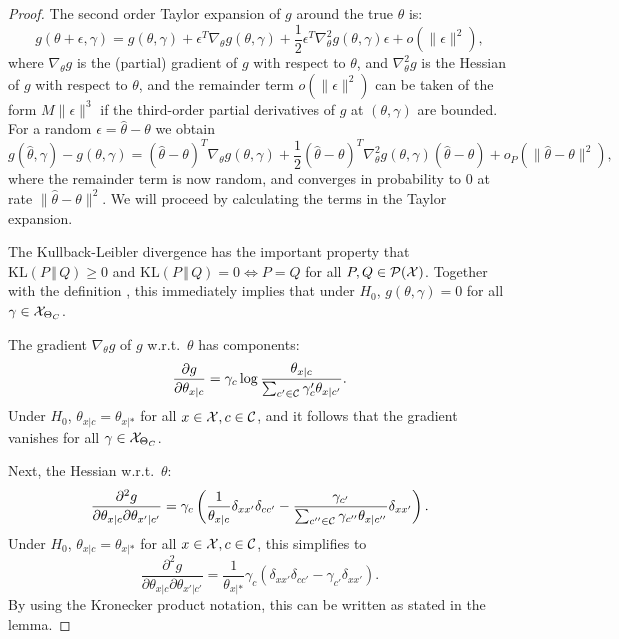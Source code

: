 \begin{proof}
The second order Taylor expansion of $g$ around the true $\theta$ is:
$$g(\theta + \epsilon, \gamma) = g(\theta,\gamma) + \epsilon^T \nabla_\theta g(\theta,\gamma) + \frac{1}{2} \epsilon^T \nabla^2_\theta g(\theta,\gamma) \epsilon + o(\lVert\epsilon\rVert^2),$$
where $\nabla_\theta g$ is the (partial) gradient of $g$ with respect to $\theta$, and
$\nabla_\theta^2 g$ is the Hessian of $g$ with respect to $\theta$, and the remainder
term $o(\lVert\epsilon\rVert^2)$ can be taken of the form $M \lVert\epsilon\rVert^3$ if the 
third-order partial derivatives of $g$ at $(\theta,\gamma)$ are bounded.
For a random $\epsilon = \hat\theta - \theta$ we obtain
  \begin{equation}
    g(\hat\theta, \gamma) - g(\theta,\gamma) = (\hat\theta - \theta)^T \nabla_\theta g(\theta,\gamma) + \frac{1}{2} (\hat\theta - \theta)^T \nabla^2_\theta g(\theta,\gamma) (\hat\theta - \theta) + o_P(\lVert\hat\theta - \theta\rVert^2),
  \end{equation}
where the remainder term is now random, and converges 
in probability to 0 at rate $\lVert\hat\theta - \theta\rVert^2$.
We will proceed by calculating the terms in the Taylor expansion.

The Kullback-Leibler divergence has the important property that $\mathrm{KL}(P \,\Vert\, Q) \ge 0$ and $\mathrm{KL}(P \,\Vert\, Q) = 0 \iff P = Q$ for all $P,Q \in \mathcal{P}(\mathcal{X})$. 
Together with the definition , 
this immediately implies that under $H_0$, $g(\theta,\gamma) = 0$ for all $\gamma \in \mathcal{X}_{\Theta_C}$.

The gradient $\nabla_\theta g$ of $g$ w.r.t.\ $\theta$ has components:
  $$\frac{\partial g}{\partial \theta_{x|c}} 
  = \gamma_c \log \frac{\theta_{x|c}}{\sum_{c'\in\mathcal{C}} \gamma_c' \theta_{x|c'}}.$$
Under $H_0$, $\theta_{x|c} = \theta_{x|\ast}$ for all $x\in\mathcal{X},c\in\mathcal{C}$, and it follows that
the gradient vanishes for all $\gamma\in\mathcal{X}_{\Theta_C}$.

Next, the Hessian w.r.t.\ $\theta$:
  $$\frac{\partial^2 g}{\partial \theta_{x|c} \partial \theta_{x'|c'}} = 
  \gamma_c \left( \frac{1}{\theta_{x|c}} \delta_{xx'} \delta_{cc'} - \frac{\gamma_{c'}}{\sum_{c''\in\mathcal{C}} \gamma_{c''} \theta_{x|c''}} \delta_{xx'} \right).
  $$
Under $H_0$, $\theta_{x|c} = \theta_{x|\ast}$ for all $x\in\mathcal{X},c\in\mathcal{C}$, this simplifies to
  $$\frac{\partial^2 g}{\partial \theta_{x|c} \partial \theta_{x'|c'}} = 
  \frac{1}{\theta_{x|\ast}} \gamma_c \left( \delta_{xx'} \delta_{cc'} - \gamma_{c'} \delta_{xx'} \right).
  $$
By using the Kronecker product notation, this can be written as stated in the lemma.


\end{proof}
